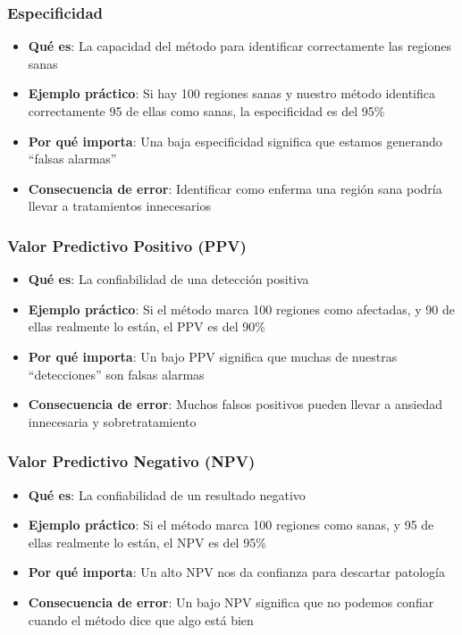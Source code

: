 \documentclass[12pt,a4paper]{article}
\begin{document}
\subsubsection{Especificidad}
\begin{itemize}
\item \textbf{Qué es}: La capacidad del método para identificar correctamente las regiones sanas
\item \textbf{Ejemplo práctico}: Si hay 100 regiones sanas y nuestro método identifica correctamente 95 de ellas como sanas, la especificidad es del 95\%
\item \textbf{Por qué importa}: Una baja especificidad significa que estamos generando ``falsas alarmas''
\item \textbf{Consecuencia de error}: Identificar como enferma una región sana podría llevar a tratamientos innecesarios
\end{itemize}

\subsubsection{Valor Predictivo Positivo (PPV)}
\begin{itemize}
\item \textbf{Qué es}: La confiabilidad de una detección positiva
\item \textbf{Ejemplo práctico}: Si el método marca 100 regiones como afectadas, y 90 de ellas realmente lo están, el PPV es del 90\%
\item \textbf{Por qué importa}: Un bajo PPV significa que muchas de nuestras ``detecciones'' son falsas alarmas
\item \textbf{Consecuencia de error}: Muchos falsos positivos pueden llevar a ansiedad innecesaria y sobretratamiento
\end{itemize}

\subsubsection{Valor Predictivo Negativo (NPV)}
\begin{itemize}
\item \textbf{Qué es}: La confiabilidad de un resultado negativo
\item \textbf{Ejemplo práctico}: Si el método marca 100 regiones como sanas, y 95 de ellas realmente lo están, el NPV es del 95\%
\item \textbf{Por qué importa}: Un alto NPV nos da confianza para descartar patología
\item \textbf{Consecuencia de error}: Un bajo NPV significa que no podemos confiar cuando el método dice que algo está bien
\end{itemize}
\end{document}
